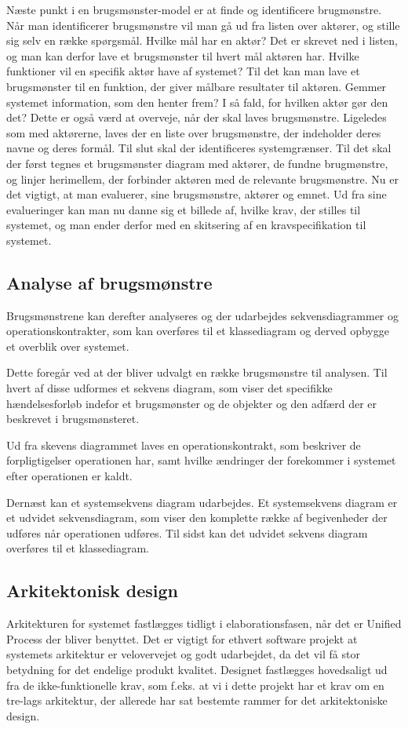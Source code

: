 Næste punkt i en brugsmønster-model er at finde og identificere brugmønstre.
Når man identificerer brugsmønstre vil man gå ud fra listen over aktører, og stille sig selv en række spørgsmål. Hvilke mål har en aktør? Det er skrevet ned i listen, og man kan derfor lave et brugsmønster til hvert mål aktøren har. Hvilke funktioner vil en specifik aktør have af systemet? Til det kan man lave et brugsmønster til en funktion, der giver målbare resultater til aktøren. Gemmer systemet information, som den henter frem? I så fald, for hvilken aktør gør den det? Dette er også værd at overveje, når der skal laves brugsmønstre. Ligeledes som med aktørerne, laves der en liste over brugsmønstre, der indeholder deres navne og deres formål.
Til slut skal der identificeres systemgrænser. Til det skal der først tegnes et brugsmønster diagram med aktører, de fundne brugmønstre, og linjer herimellem, der forbinder aktøren med de relevante brugsmønstre. Nu er det vigtigt, at man evaluerer, sine brugsmønstre, aktører og emnet. Ud fra sine evalueringer kan man nu danne sig et billede af, hvilke krav, der stilles til systemet, og man ender derfor med en skitsering af en kravspecifikation til systemet.


\subsection{Analyse af brugsmønstre}
Brugsmønstrene kan derefter analyseres og der udarbejdes sekvensdiagrammer og operationskontrakter, som kan overføres til et klassediagram og derved opbygge et overblik over systemet. 

Dette foregår ved at der bliver udvalgt en række brugsmønstre til analysen. Til hvert af disse udformes et sekvens diagram, som viser det specifikke hændelsesforløb indefor et brugsmønster og de objekter og den adfærd der er beskrevet i brugsmønsteret. 

Ud fra skevens diagrammet laves en operationskontrakt, som beskriver de forpligtigelser operationen har, samt hvilke ændringer der forekommer i systemet efter operationen er kaldt. 

Dernæst kan et systemsekvens diagram udarbejdes. Et systemsekvens diagram er et udvidet sekvensdiagram, som viser den komplette række af begivenheder der udføres når operationen udføres. Til sidst kan det udvidet sekvens diagram overføres til et klassediagram. 


\subsection{Arkitektonisk design}
Arkitekturen for systemet fastlægges tidligt i elaborationsfasen, når det er Unified Process der bliver benyttet. Det er vigtigt for ethvert software projekt at systemets arkitektur er velovervejet og godt udarbejdet, da det vil få stor betydning for det endelige produkt kvalitet. Designet fastlægges hovedsaligt ud fra de ikke-funktionelle krav, som f.eks. at vi i dette projekt har et krav om en tre-lags arkitektur, der allerede har sat bestemte rammer for det arkitektoniske design. 


